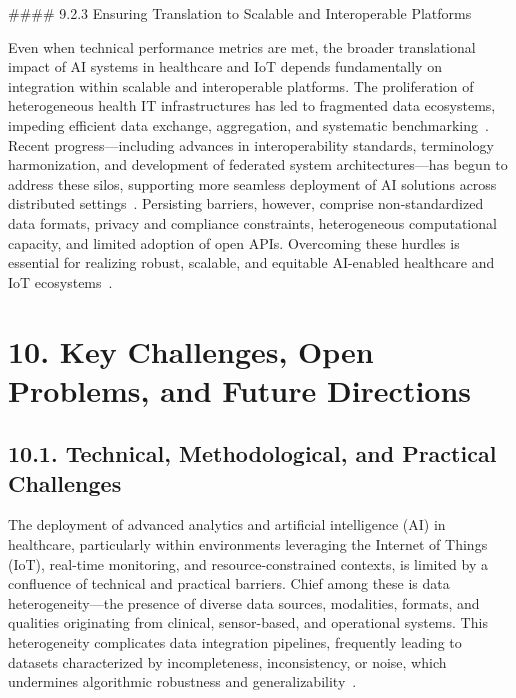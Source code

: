 \documentclass[11pt]{article}
\begin{document}
#### 9.2.3 Ensuring Translation to Scalable and Interoperable Platforms

Even when technical performance metrics are met, the broader translational impact of AI systems in healthcare and IoT depends fundamentally on integration within scalable and interoperable platforms. The proliferation of heterogeneous health IT infrastructures has led to fragmented data ecosystems, impeding efficient data exchange, aggregation, and systematic benchmarking~\cite{ref33,ref35,ref46,ref65}. Recent progress—including advances in interoperability standards, terminology harmonization, and development of federated system architectures—has begun to address these silos, supporting more seamless deployment of AI solutions across distributed settings~\cite{ref35,ref46,ref47}. Persisting barriers, however, comprise non-standardized data formats, privacy and compliance constraints, heterogeneous computational capacity, and limited adoption of open APIs. Overcoming these hurdles is essential for realizing robust, scalable, and equitable AI-enabled healthcare and IoT ecosystems~\cite{ref34,ref65}.

\section{10. Key Challenges, Open Problems, and Future Directions}

\subsection{10.1. Technical, Methodological, and Practical Challenges}

The deployment of advanced analytics and artificial intelligence (AI) in healthcare, particularly within environments leveraging the Internet of Things (IoT), real-time monitoring, and resource-constrained contexts, is limited by a confluence of technical and practical barriers. Chief among these is data heterogeneity—the presence of diverse data sources, modalities, formats, and qualities originating from clinical, sensor-based, and operational systems. This heterogeneity complicates data integration pipelines, frequently leading to datasets characterized by incompleteness, inconsistency, or noise, which undermines algorithmic robustness and generalizability~\cite{ref16,ref18,ref25,ref28,ref29,ref30,ref31,ref33,ref34,ref36,ref37,ref45,ref46,ref49,ref50,ref53,ref54,ref55,ref51,ref56,ref57,ref58,ref59,ref60,ref61,ref65,ref66,ref67,ref68,ref70,ref71,ref72,ref73,ref74,ref75,ref76,ref78,ref82,ref83,ref84,ref89,ref90,ref98,ref101,ref102,ref103,ref104,ref105,ref106,ref107}.
\end{document}
